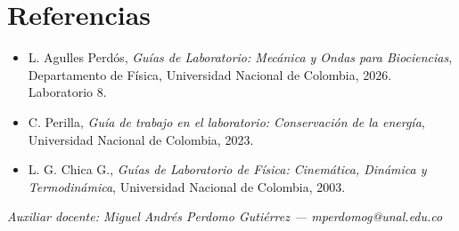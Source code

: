 \documentclass[11pt, letterpaper]{article}
\begin{document}
	\section{Referencias}
	
	\begin{itemize}
		\item L. Agulles Perdós, \emph{Guías de Laboratorio: Mecánica y Ondas para
			Biociencias}, Departamento de Física, Universidad Nacional de Colombia,
		2026. Laboratorio 8.
		\item C. Perilla, \emph{Guía de trabajo en el laboratorio: Conservación de
			la energía}, Universidad Nacional de Colombia, 2023.
		\item L. G. Chica G., \emph{Guías de Laboratorio de Física: Cinemática,
			Dinámica y Termodinámica}, Universidad Nacional de Colombia, 2003.
	\end{itemize}
	
	\vfill
	\noindent
	{\footnotesize \textit{Auxiliar docente: Miguel Andrés Perdomo Gutiérrez ---
			mperdomog@unal.edu.co}}
	
\end{document}
